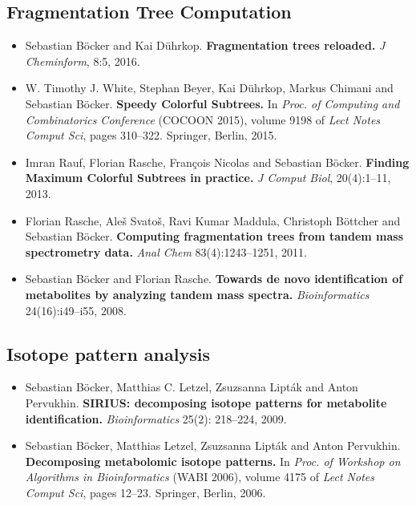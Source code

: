 \documentclass[letterpaper,10pt,openany,oneside]{sphinxmanual}
\begin{document}
\subsection*{Fragmentation Tree Computation}
\label{introduction:fragmentation-tree-computation}

\begin{itemize}
\item Sebastian Böcker and Kai Dührkop.
\textbf{Fragmentation trees reloaded.}
\emph{J Cheminform}, 8:5, 2016.

\item W. Timothy J. White, Stephan Beyer, Kai Dührkop, Markus Chimani and Sebastian Böcker.
\textbf{Speedy Colorful Subtrees.}
In \emph{Proc. of Computing and Combinatorics Conference} (COCOON 2015), volume 9198 of \emph{Lect Notes Comput Sci}, pages 310--322. Springer, Berlin, 2015.

\item Imran Rauf, Florian Rasche, François Nicolas and Sebastian Böcker.
\textbf{Finding Maximum Colorful Subtrees in practice.}
\emph{J Comput Biol}, 20(4):1--11, 2013.

\item Florian Rasche, Aleš Svatoš, Ravi Kumar Maddula, Christoph Böttcher and Sebastian Böcker.
\textbf{Computing fragmentation trees from tandem mass spectrometry data.}
\emph{Anal Chem} 83(4):1243–1251, 2011.

\item Sebastian Böcker and Florian Rasche.
\textbf{Towards de novo identification of metabolites by analyzing tandem mass spectra.}
\emph{Bioinformatics} 24(16):i49--i55, 2008.
\end{itemize}


\subsection*{Isotope pattern analysis}
\label{introduction:isotope-pattern-analysis}

\begin{itemize}
\item Sebastian Böcker, Matthias C. Letzel, Zsuzsanna Lipták and Anton
Pervukhin.
\textbf{SIRIUS: decomposing isotope patterns for metabolite identification.}
\emph{Bioinformatics} 25(2): 218--224, 2009.

\item Sebastian Böcker, Matthias Letzel, Zsuzsanna Lipták and Anton Pervukhin.
\textbf{Decomposing metabolomic isotope patterns.}
In \emph{Proc. of Workshop on Algorithms in Bioinformatics} (WABI 2006), volume 4175 of \emph{Lect Notes Comput Sci}, pages 12--23. Springer, Berlin, 2006. 
\end{itemize}
\end{document}
